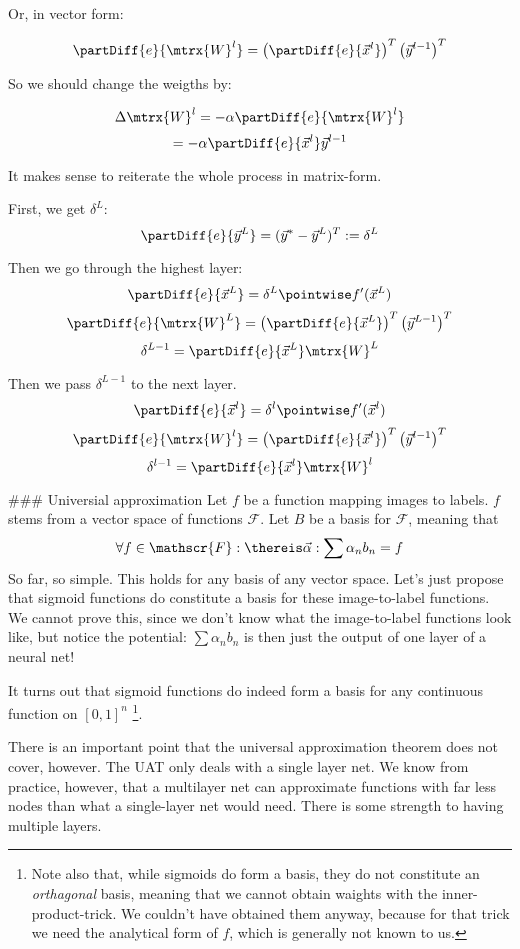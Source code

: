 Or, in vector form: 

$$ \partDiff{e}{\mtrx{W}^l} = \left( \partDiff{e}{\vec{x}^l} \right)^T  \left( \vec{y}^{l-1} \right)^T $$ 

So we should change the weigths by: 

$$ \Delta \mtrx{W}^l = - \alpha \partDiff{e}{\mtrx{W}^l} $$
$$ = - \alpha \partDiff{e}{\vec{x}^l} \vec{y}^{l-1} $$


It makes sense to reiterate the whole process in matrix-form. 

First, we  get $\delta^L$:
$$ \partDiff{e}{\vec{y}^L} = (\vec{y}^* - \vec{y}^L)^T := \delta^L $$ 

Then we go through the highest layer:
$$ \partDiff{e}{\vec{x}^L} = \delta^L \pointwise f'(\vec{x}^L)  $$
$$ \partDiff{e}{\mtrx{W}^L} = \left( \partDiff{e}{\vec{x}^L} \right)^T \left( \vec{y}^{L-1} \right)^T $$
$$ \delta^{L-1} = \partDiff{e}{\vec{x}^L} \mtrx{W}^L $$

Then we pass $\delta^{L-1}$ to the next layer. 
$$ \partDiff{e}{\vec{x}^l} = \delta^l \pointwise f'(\vec{x}^l)  $$
$$ \partDiff{e}{\mtrx{W}^l} = \left( \partDiff{e}{\vec{x}^l} \right)^T  \left( \vec{y}^{l-1} \right)^T $$
$$ \delta^{l-1} = \partDiff{e}{\vec{x}^l} \mtrx{W}^l $$



### Universial approximation
Let $f$ be a function mapping images to labels. $f$ stems from a vector space of functions $\mathscr{F}$. Let $B$ be a basis for $\mathscr{F}$, meaning that 
$$ \forall f \in \mathscr{F}: \thereis \vec{\alpha}: \sum \alpha_n b_n = f $$
So far, so simple. This holds for any basis of any vector space. Let's just propose that sigmoid functions do constitute a basis for these image-to-label functions. We cannot prove this, since we don't know what the image-to-label functions look like, but notice the potential: 
$ \sum \alpha_n b_n $ is then just the output of one layer of a neural net!

It turns out that sigmoid functions do indeed form a basis for any continuous function on $[0,1]^n$ \footnote{Note also that, while sigmoids do form a basis, they do not constitute an \emph{orthagonal} basis, meaning that we cannot obtain waights with the inner-product-trick. We couldn't have obtained them anyway, because for that trick we need the analytical form of $f$, which is generally not known to us.}.

There is an important point that the universal approximation theorem does not cover, however. The UAT only deals with a single layer net. We know from practice, however, that a multilayer net can approximate functions with far less nodes than what a single-layer net would need. There is some strength to having multiple layers.



